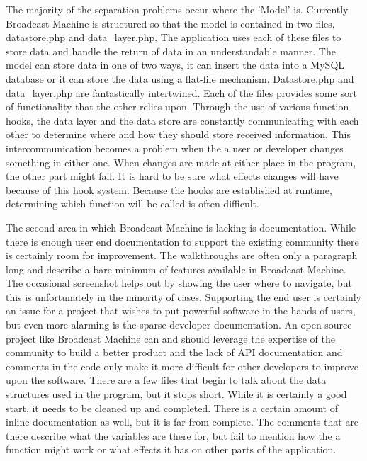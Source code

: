 \documentclass[a4paper,12pt]{report}
\begin{document}
The majority of the separation problems occur where the 'Model' is. Currently Broadcast Machine is structured so that the model is contained in two files, datastore.php and data_layer.php. The application uses each of these files to store data and handle the return of data in an understandable manner. The model can store data in one of two ways, it can insert the data into a MySQL database or it can store the data using a flat-file mechanism. Datastore.php and data_layer.php are fantastically intertwined. Each of the files provides some sort of functionality that the other relies upon. Through the use of various function hooks, the data layer and the data store are constantly communicating with each other to determine where and how they should store received information. This intercommunication becomes a problem when the a user or developer changes something in either one. When changes are made at either place in the program, the other part might fail. It is hard to be sure what effects changes will have because of this hook system. Because the hooks are established at runtime, determining which function will be called is often difficult.
	
	The second area in which Broadcast Machine is lacking is documentation. 
While there is enough user end documentation to support the existing community there is certainly room for improvement. 
The walkthroughs are often only a paragraph long and describe a bare minimum of features available in Broadcast Machine. 
The occasional screenshot helps out by showing the user where to navigate, but this is unfortunately in the minority of cases. 
Supporting the end user is certainly an issue for a project that wishes to put powerful software in the hands of users, but even more alarming is the sparse developer documentation. 
An open-source project like Broadcast Machine can and should leverage the expertise of the community to build a better product and the lack of API documentation and comments in the code only make it more difficult for other developers to improve upon the software. 
There are a few files that begin to talk about the data structures used in the program, but it stops short. 
While it is certainly a good start, it needs to be cleaned up and completed. There is a certain amount of inline documentation as well, but it is far from complete. 
The comments that are there describe what the variables are there for, but fail to mention how the a function might work or what effects it has on other parts of the application.
	
\end{document}
